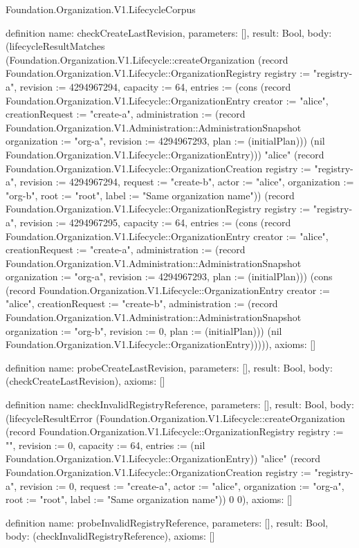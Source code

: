 \begin{lexlean}{Foundation.Organization.V1.LifecycleCorpus}
\begin{semanticmodule}
definition{
  name: checkCreateLastRevision,
  parameters: [],
  result: Bool,
  body: (lifecycleResultMatches (Foundation.Organization.V1.Lifecycle::createOrganization (record Foundation.Organization.V1.Lifecycle::OrganizationRegistry {registry := "registry-a", revision := 4294967294, capacity := 64, entries := (cons (record Foundation.Organization.V1.Lifecycle::OrganizationEntry {creator := "alice", creationRequest := "create-a", administration := (record Foundation.Organization.V1.Administration::AdministrationSnapshot {organization := "org-a", revision := 4294967293, plan := (initialPlan)})}) (nil Foundation.Organization.V1.Lifecycle::OrganizationEntry))}) "alice" (record Foundation.Organization.V1.Lifecycle::OrganizationCreation {registry := "registry-a", revision := 4294967294, request := "create-b", actor := "alice", organization := "org-b", root := "root", label := "Same organization name"})) (record Foundation.Organization.V1.Lifecycle::OrganizationRegistry {registry := "registry-a", revision := 4294967295, capacity := 64, entries := (cons (record Foundation.Organization.V1.Lifecycle::OrganizationEntry {creator := "alice", creationRequest := "create-a", administration := (record Foundation.Organization.V1.Administration::AdministrationSnapshot {organization := "org-a", revision := 4294967293, plan := (initialPlan)})}) (cons (record Foundation.Organization.V1.Lifecycle::OrganizationEntry {creator := "alice", creationRequest := "create-b", administration := (record Foundation.Organization.V1.Administration::AdministrationSnapshot {organization := "org-b", revision := 0, plan := (initialPlan)})}) (nil Foundation.Organization.V1.Lifecycle::OrganizationEntry)))})),
  axioms: []
}

definition{
  name: probeCreateLastRevision,
  parameters: [],
  result: Bool,
  body: (checkCreateLastRevision),
  axioms: []
}

definition{
  name: checkInvalidRegistryReference,
  parameters: [],
  result: Bool,
  body: (lifecycleResultError (Foundation.Organization.V1.Lifecycle::createOrganization (record Foundation.Organization.V1.Lifecycle::OrganizationRegistry {registry := "", revision := 0, capacity := 64, entries := (nil Foundation.Organization.V1.Lifecycle::OrganizationEntry)}) "alice" (record Foundation.Organization.V1.Lifecycle::OrganizationCreation {registry := "registry-a", revision := 0, request := "create-a", actor := "alice", organization := "org-a", root := "root", label := "Same organization name"})) 0 0),
  axioms: []
}

definition{
  name: probeInvalidRegistryReference,
  parameters: [],
  result: Bool,
  body: (checkInvalidRegistryReference),
  axioms: []
}


\end{semanticmodule}
\end{lexlean}
